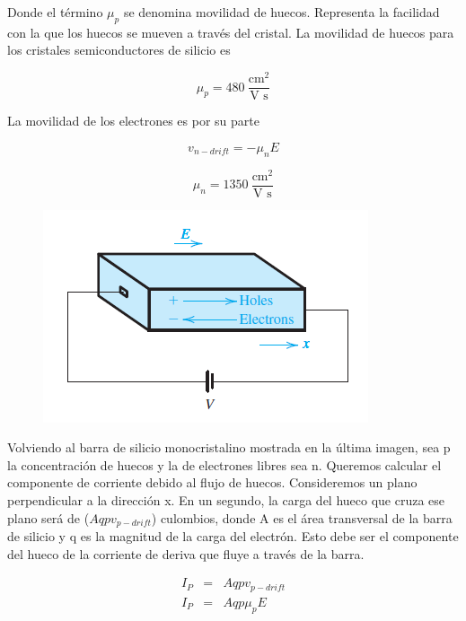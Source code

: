 Donde el término $\mu_p$ se denomina movilidad de huecos.  Representa la facilidad con la que los huecos se mueven a través del cristal. La movilidad de huecos para los cristales semiconductores de silicio es 

\begin{equation*}
\mu_p = 480 \ \frac{\text{cm}^2}{\text{V s}}
\end{equation*}

La movilidad de los electrones es por su parte 

\begin{equation*}
v_{n-drift} = -\mu_n E
\end{equation*}

\begin{equation*}
\mu_n = 1350 \ \frac{\text{cm}^2}{\text{V s}}
\end{equation*}

\begin{figure}[H]
    \centering
    \includegraphics[scale=0.6]{Electronica/semiconductor_f1.png}
\end{figure}

Volviendo al barra de silicio monocristalino mostrada en la última imagen, sea p la concentración de huecos y la de electrones libres sea n. Queremos calcular el componente de corriente debido al flujo de huecos. Consideremos un plano perpendicular a la dirección x. En un segundo, la carga del hueco que cruza ese plano será de ($A q p v_{p-drift}$) culombios, donde A es el área transversal de la barra de silicio y q es la magnitud de la carga del electrón. Esto debe ser el componente del hueco de la corriente de deriva que fluye a través de la barra.

\begin{eqnarray*}
I_P &=& A q p v_{p-drift} \\
I_P &=& A q p \mu_p E
\end{eqnarray*}

